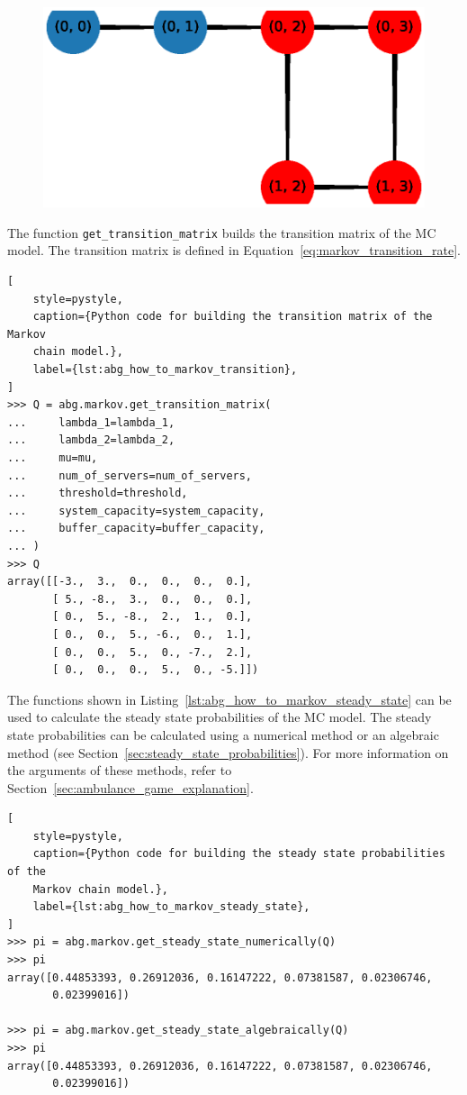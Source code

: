 \begin{figure}[H]
    \centering
    \includegraphics[width=\textwidth]{chapters/00_appendix/01_ambulance_game_library/Bin/visualise_markov.eps}
\end{figure}

The function \texttt{get\_transition\_matrix} builds the transition matrix
of the MC model.
The transition matrix is defined in Equation~\ref{eq:markov_transition_rate}.

\begin{lstlisting}[
    style=pystyle,
    caption={Python code for building the transition matrix of the Markov
    chain model.},
    label={lst:abg_how_to_markov_transition},
]
>>> Q = abg.markov.get_transition_matrix(
...     lambda_1=lambda_1,
...     lambda_2=lambda_2,
...     mu=mu,
...     num_of_servers=num_of_servers,
...     threshold=threshold,
...     system_capacity=system_capacity,
...     buffer_capacity=buffer_capacity,
... )
>>> Q
array([[-3.,  3.,  0.,  0.,  0.,  0.],
       [ 5., -8.,  3.,  0.,  0.,  0.],
       [ 0.,  5., -8.,  2.,  1.,  0.],
       [ 0.,  0.,  5., -6.,  0.,  1.],
       [ 0.,  0.,  5.,  0., -7.,  2.],
       [ 0.,  0.,  0.,  5.,  0., -5.]])

\end{lstlisting}

The functions shown in Listing~\ref{lst:abg_how_to_markov_steady_state} can be
used to calculate the steady state probabilities of the MC model.
The steady state probabilities can be calculated using a numerical method or
an algebraic method (see Section~\ref{sec:steady_state_probabilities}).
For more information on the arguments of these methods, refer to
Section~\ref{sec:ambulance_game_explanation}.

\begin{lstlisting}[
    style=pystyle,
    caption={Python code for building the steady state probabilities of the
    Markov chain model.},
    label={lst:abg_how_to_markov_steady_state},
]
>>> pi = abg.markov.get_steady_state_numerically(Q)
>>> pi
array([0.44853393, 0.26912036, 0.16147222, 0.07381587, 0.02306746,
       0.02399016])

>>> pi = abg.markov.get_steady_state_algebraically(Q)
>>> pi
array([0.44853393, 0.26912036, 0.16147222, 0.07381587, 0.02306746,
       0.02399016])
    
\end{lstlisting}

